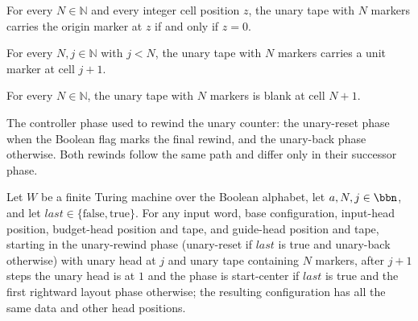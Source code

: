 \begin{lemma}
\label{Complexity.unaryTape_origin}
\leanok
{}
For every $N\in\mathbb{N}$ and every integer cell position $z$, the unary tape with $N$
markers carries the origin marker at $z$ if and only if $z=0$.
\end{lemma}

\begin{lemma}
\label{Complexity.unaryTape_unit}
\leanok
{}
For every $N,j\in\mathbb{N}$ with $j<N$, the unary tape with $N$ markers carries a unit
marker at cell $j+1$.
\end{lemma}

\begin{lemma}
\label{Complexity.unaryTape_end}
\leanok
{}
For every $N\in\mathbb{N}$, the unary tape with $N$ markers is blank at cell $N+1$.
\end{lemma}

\begin{definition}
\label{Complexity.unaryRewindPhase}
\leanok
{}
The controller phase used to rewind the unary counter: the unary-reset phase when the
Boolean flag marks the final rewind, and the unary-back phase otherwise.  Both rewinds
follow the same path and differ only in their successor phase.
\end{definition}

\begin{lemma}
\label{Complexity.setupCfg_unary_rewind}
\leanok
{}
Let $W$ be a finite Turing machine over the Boolean alphabet, let $a,N,j\in\bbn$, and
let $last\in\{\mathrm{false},\mathrm{true}\}$. For any input word, base configuration,
input-head position, budget-head position and tape, and guide-head position and tape,
starting in the unary-rewind phase (unary-reset if $last$ is true and unary-back
otherwise) with unary head at $j$ and unary tape containing $N$ markers, after $j+1$
steps the unary head is at $1$ and the phase is start-center if $last$ is true and the
first rightward layout phase otherwise; the resulting configuration has all the same
data and other head positions.
\end{lemma}


